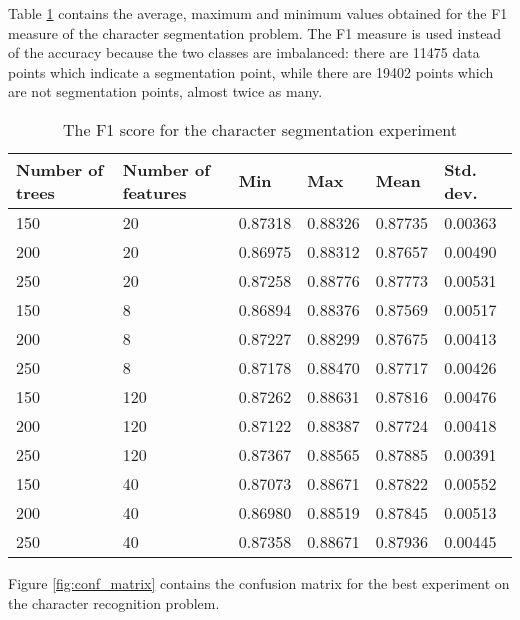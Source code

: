 Table \ref{table:seg_values} contains the average, maximum and minimum values obtained for the F1 measure\cite{fawcett2006introduction} of the character segmentation problem. The F1 measure is used instead of the accuracy because the two classes are imbalanced: there are 11475 data points which indicate a segmentation point, while there are 19402 points which are not segmentation points, almost twice as many. 

\begin{table}[h]
\caption{The F1 score for the character segmentation experiment}
\label{table:seg_values}
\begin{tabular}{llllll}
\hline
Number of trees & Number of features & Min     & Max     & Mean    & Std. dev. \\ \hline
150 & 20 & 0.87318 & 0.88326 & 0.87735 & 0.00363 \\ 
200 & 20 & 0.86975 & 0.88312 & 0.87657 & 0.00490 \\ 
250 & 20 & 0.87258 & 0.88776 & 0.87773 & 0.00531 \\ 
150 & 8 & 0.86894 & 0.88376 & 0.87569 & 0.00517 \\ 
200 & 8 & 0.87227 & 0.88299 & 0.87675 & 0.00413 \\ 
250 & 8 & 0.87178 & 0.88470 & 0.87717 & 0.00426 \\ 
150 & 120 & 0.87262 & 0.88631 & 0.87816 & 0.00476 \\ 
200 & 120 & 0.87122 & 0.88387 & 0.87724 & 0.00418 \\ 
250 & 120 & 0.87367 & 0.88565 & 0.87885 & 0.00391 \\ 
150 & 40 & 0.87073 & 0.88671 & 0.87822 & 0.00552 \\ 
200 & 40 & 0.86980 & 0.88519 & 0.87845 & 0.00513 \\ 
250 & 40 & 0.87358 & 0.88671 & 0.87936 & 0.00445 \\  \hline
\end{tabular}
\end{table}

Figure \ref{fig:conf_matrix} contains the confusion matrix for the best experiment on the character recognition problem.


